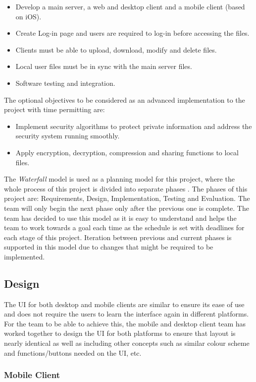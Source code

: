 \documentclass{article}
\begin{document}
\begin{itemize}
  \item Develop a main server, a web and desktop client and a mobile client (based on iOS).
  \item Create Log-in page and users are required to log-in before accessing the files.
  \item Clients must be able to upload, download, modify and delete files.
  \item Local user files must be in sync with the main server files.
  \item Software testing and integration.
\end{itemize}
The optional objectives to be considered as an advanced implementation to the project with time permitting are:
\begin{itemize}
  \item Implement security algorithms to protect private information and address the security system running smoothly.
  \item Apply encryption, decryption, compression and sharing functions to local files.
\end{itemize}

The \emph{Waterfall} model is used as a planning model for this project, where the whole process of this project is divided into separate phases \cite{c3}. The phases of this project are: Requirements, Design, Implementation, Testing and Evaluation. The team will only begin the next phase only after the previous one is complete. The team has decided to use this model as it is easy to understand and helps the team to work towards a goal each time as the schedule is set with deadlines for each stage of this project. Iteration between previous and current phases is supported in this model due to changes that might be required to be implemented.

\subsection{Design}
The UI for both desktop and mobile clients are similar to ensure its ease of use and does not require the users to learn the interface again in different platforms. For the team to be able to achieve this, the mobile and desktop client team has worked together to design the UI for both platforms to ensure that layout is nearly identical as well as including other concepts such as similar colour scheme and functions/buttons needed on the UI, etc.

\subsubsection{Mobile Client}
\end{document}
